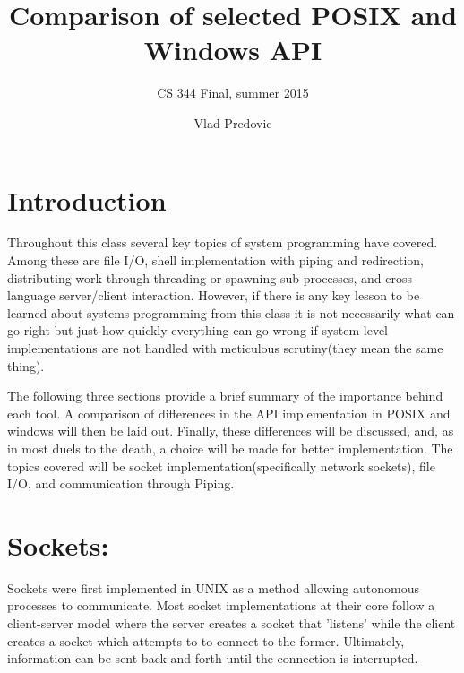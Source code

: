 \documentclass[letterpaper,10pt,titlepage]{article}
\begin{document}
\title{Comparison of selected POSIX and Windows API}
\subtitle{CS 344 Final, summer 2015 }
\author{Vlad Predovic}
\maketitle





\section{Introduction}
	Throughout this class several key topics of system programming have covered. Among these are file I/O, shell implementation with piping and redirection, 
distributing work through threading or spawning sub-processes, and cross language server/client interaction. However, 
if there is any key lesson to be learned about systems programming from this class it is not necessarily what can go right 
but just how quickly everything can go wrong if system level implementations are not handled with meticulous scrutiny(they mean the same thing).

	The following three sections provide a brief summary of the importance behind each tool. 
A comparison of differences in the API implementation in POSIX and windows will then be laid out.
Finally, these differences will be discussed, and, as in most duels to the death, a choice will be made for better implementation.
The topics covered will be socket implementation(specifically network sockets), file I/O, and communication through Piping.



\section{Sockets:}
	Sockets were first implemented in UNIX as a method allowing autonomous processes to communicate. Most socket implementations
at their core follow a client-server model where the server creates a socket that 'listens'
while the client creates a socket which attempts to to connect to the former. Ultimately, information can
be sent back and forth until the connection is interrupted.
\end{document}
